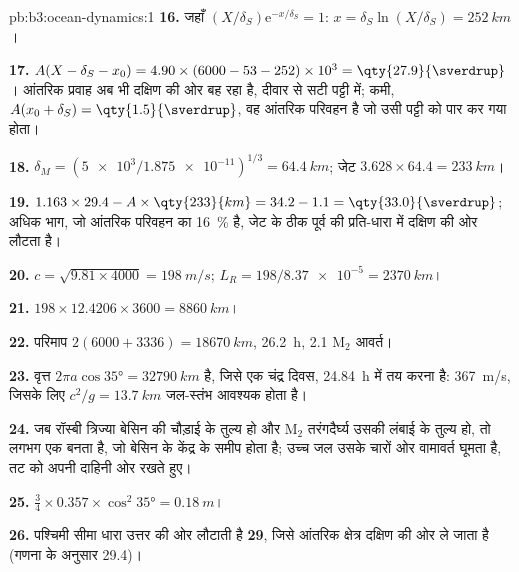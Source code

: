 \begin{solution}{pb:b3:ocean-dynamics:1}
\textbf{16.} जहाँ $(X/\delta_S)\mathrm e^{-x/\delta_S} = 1$: $x =
\delta_S\ln(X/\delta_S) = \qty{252}{km}$।

\textbf{17.} $A(X - \delta_S - x_0) = 4.90\times(6000 - 53 - 252)\times
10^3 = \qty{27.9}{\sverdrup}$। आंतरिक प्रवाह अब भी दक्षिण की ओर बह रहा है,
दीवार से सटी पट्टी में; कमी, $A(x_0 + \delta_S) =
\qty{1.5}{\sverdrup}$, वह आंतरिक परिवहन है जो
उसी पट्टी को पार कर गया होता।

\textbf{18.} $\delta_M = (\num{5e3}/\num{1.875e-11})^{1/3} = \qty{64.4}{km}$;
जेट $3.628\times64.4 = \qty{233}{km}$।

\textbf{19.} $1.163\times29.4 - A\times\qty{233}{km} = 34.2 - 1.1 =
\qty{33.0}{\sverdrup}$; अधिक भाग, जो आंतरिक परिवहन का \qty{16}{\percent} है,
जेट के ठीक पूर्व की प्रति-धारा में दक्षिण की ओर लौटता है।

\textbf{20.} $c = \sqrt{9.81\times4000} = \qty{198}{m/s}$; $L_R =
198/\num{8.37e-5} = \qty{2370}{km}$।

\textbf{21.} $198\times12.4206\times3600 = \qty{8860}{km}$।

\textbf{22.} परिमाप $2(6000 + 3336) = \qty{18670}{km}$, \qty{26.2}{h},
2.1 M$_2$ आवर्त।

\textbf{23.} वृत्त $2\pi a\cos\ang{35} = \qty{32790}{km}$ है, जिसे
एक चंद्र दिवस, \qty{24.84}{h} में तय करना है: \qty{367}{m/s}, जिसके लिए $c^2/g =
\qty{13.7}{km}$ जल-स्तंभ आवश्यक होता है।

\textbf{24.} जब रॉस्बी त्रिज्या बेसिन की चौड़ाई के तुल्य हो और
M$_2$ तरंगदैर्घ्य उसकी लंबाई के तुल्य हो, तो लगभग एक  बनता है, जो बेसिन के केंद्र के समीप होता है; उच्च जल उसके चारों ओर वामावर्त घूमता है,
तट को अपनी दाहिनी ओर रखते हुए।

\textbf{25.} $\tfrac34\times0.357\times\cos^2\ang{35} = \qty{0.18}{m}$।

\textbf{26.} पश्चिमी सीमा धारा उत्तर की ओर लौटाती है
\textbf{\qty[text-series-to-math=true]{29}{\sverdrup}}, जिसे आंतरिक क्षेत्र
दक्षिण की ओर ले जाता है (गणना के अनुसार \qty{29.4}{\sverdrup})।
\end{solution}
